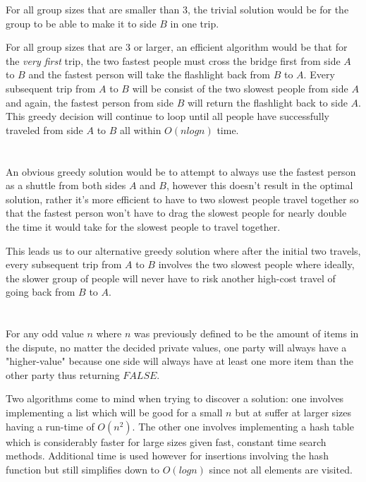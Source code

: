 \documentclass[12pt]{article}
\begin{document}
\noindent For all group sizes that are smaller than 3, the trivial solution would be for the group to be able to make it to side \(B\) in one trip.\newline

\noindent For all group sizes that are 3 or larger, an efficient algorithm would be that for the \textit{very first} trip, the two fastest people must cross the bridge first from side \(A\) to \(B\) and the fastest person will take the flashlight back from \(B\) to \(A\). Every subsequent trip from \(A\) to \(B\) will be consist of the two slowest people from side \(A\) and again, the fastest person from side \(B\) will return the flashlight back to side \(A\). This greedy decision will continue to loop until all people have successfully traveled from side \(A\) to \(B\) all within \(O(nlogn)\) time.

\section{}
\begin{center}
An obvious greedy solution would be to attempt to always use the fastest person as a shuttle from both sides \(A\) and \(B\), however this doesn't result in the optimal solution, rather it's more efficient to have to two slowest people travel together so that the fastest person won't have to drag the slowest people for nearly double the time it would take for the slowest people to travel together.\newline

\noindent This leads us to our alternative greedy solution where after the initial two travels, every subsequent trip from \(A\) to \(B\) involves the two slowest people where ideally, the slower group of people will never have to risk another high-cost travel of going back from \(B\) to \(A\).
\end{center}

\section{}
For any odd value \(n\) where \(n\) was previously defined to be the amount of items in the dispute, no matter the decided private values, one party will always have a "higher-value" because one side will always have at least one more item than the other party thus returning \(FALSE\).\newline

\noindent Two algorithms come to mind when trying to discover a solution: one involves implementing a list which will be good for a small \(n\) but at suffer at larger sizes having a run-time of \(O(n^2)\). The other one involves implementing a hash table which is considerably faster for large sizes given fast, constant time search methods. Additional time is used however for insertions involving the hash function but still simplifies down to \(O(logn)\) since not all elements are visited.\newline
\end{document}
